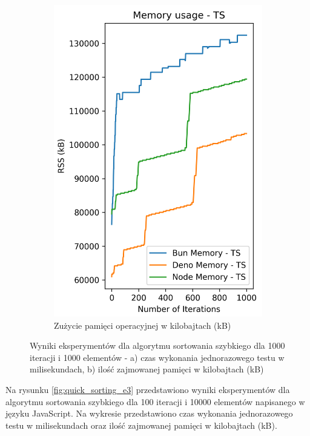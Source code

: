 \begin{figure}[H]
\begin{subfigure}[b]{0.4\textwidth}
    \includegraphics[width=\textwidth]{Figures/sorting/sorting_quick_1000_1000_ts_memory.png}
    \caption{Zużycie pamięci operacyjnej w kilobajtach (kB)}
    \label{fig:quick_sorting_e2_ts_memory}
  \end{subfigure}
  \caption{Wyniki eksperymentów dla algorytmu sortowania szybkiego dla 1000 iteracji i 1000 elementów - a) czas wykonania jednorazowego testu w milisekundach, b) ilość zajmowanej pamięci w kilobajtach (kB)}
  \label{fig:quick_sorting_e2_ts}
\end{figure}

Na rysunku \ref{fig:quick_sorting_e3} przedstawiono wyniki eksperymentów dla algorytmu sortowania szybkiego dla 100 iteracji i 10000 elementów napisanego w języku JavaScript. Na wykresie przedstawiono czas wykonania jednorazowego testu w milisekundach oraz ilość zajmowanej pamięci w kilobajtach (kB).

